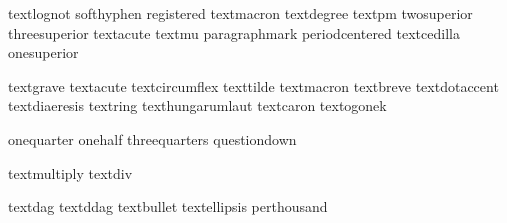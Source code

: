  textlognot     {}
 softhyphen     {}
 registered     {}
 textmacron     {}
 textdegree     {}
 textpm         {}
 twosuperior    {}
 threesuperior  {}
 textacute      {}
 textmu         {}
 paragraphmark  {}
 periodcentered {}
 textcedilla    {}
 onesuperior    {}

 textgrave        {}
 textacute        {}
 textcircumflex   {}
 texttilde        {}
 textmacron       {}
 textbreve        {}
 textdotaccent    {}
 textdiaeresis    {}
 textring         {}
 texthungarumlaut {}
 textcaron        {}
 textogonek       {}

 onequarter       {}
 onehalf          {}
 threequarters    {}
 questiondown     {}

 textmultiply     {}
 textdiv          {}

 textdag          {}
 textddag         {}
 textbullet       {}
 textellipsis     {}
 perthousand      {}


